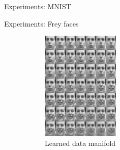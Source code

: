 \documentclass[unicode,11pt]{beamer}
\begin{document}
\begin{frame}{Experiments: MNIST}

\end{frame}


\begin{frame}{Experiments: Frey faces}
  \begin{figure}
    \centering
    \begin{subfigure}[b]{.4\linewidth}
      \centering
      \includegraphics[width=.8\linewidth]{images/vae_frey_B100_E4000_N560_L2_H200_C_manifold_8}
      \caption{Learned data manifold}
    \end{subfigure}
    \hspace{1em}
    \begin{subfigure}[b]{.4\linewidth}
      \centering

\end{subfigure}
\end{figure}
\end{frame}
\end{document}
